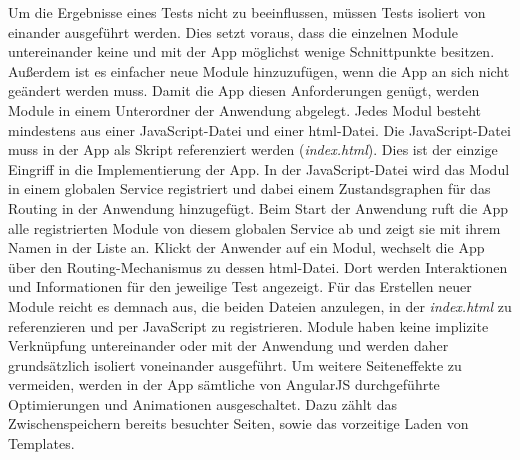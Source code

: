 Um die Ergebnisse eines Tests nicht zu beeinflussen, müssen Tests isoliert von einander ausgeführt werden. Dies setzt voraus, dass die einzelnen Module untereinander keine und mit der App möglichst wenige Schnittpunkte besitzen. Außerdem ist es einfacher neue Module hinzuzufügen, wenn die App an sich nicht geändert werden muss. Damit die App diesen Anforderungen genügt, werden Module in einem Unterordner der Anwendung abgelegt. Jedes Modul besteht mindestens aus einer JavaScript-Datei und einer \gls{html}-Datei. Die JavaScript-Datei muss in der App als Skript referenziert werden (\emph{index.html}). Dies ist der einzige Eingriff in die Implementierung der App. In der JavaScript-Datei wird das Modul in einem globalen Service registriert und dabei einem Zustandsgraphen für das \gls{Routing} in der Anwendung hinzugefügt. Beim Start der Anwendung ruft die App alle registrierten Module von diesem globalen Service ab und zeigt sie mit ihrem Namen in der Liste an. Klickt der Anwender auf ein Modul, wechselt die App über den \gls{Routing}-Mechanismus zu dessen \gls{html}-Datei. Dort werden Interaktionen und Informationen für den jeweilige Test angezeigt. Für das Erstellen neuer Module reicht es demnach aus, die beiden Dateien anzulegen, in der \emph{index.html} zu referenzieren und per JavaScript zu registrieren. Module haben keine implizite Verknüpfung untereinander oder mit der Anwendung und werden daher grundsätzlich isoliert voneinander ausgeführt. Um weitere Seiteneffekte zu vermeiden, werden in der App sämtliche von AngularJS durchgeführte Optimierungen und Animationen ausgeschaltet. Dazu zählt das Zwischenspeichern bereits besuchter Seiten, sowie das vorzeitige Laden von Templates.